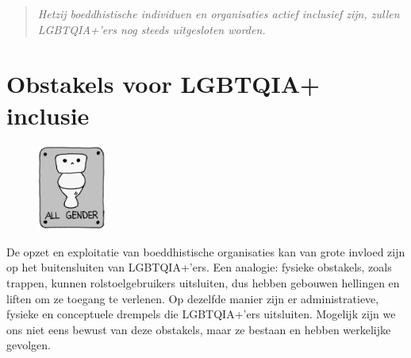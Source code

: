 \documentclass[12pt,openany]{book}
\begin{document}
\newpage
\thispagestyle{empty}
\begin{figure}[h]
    \centering
\end{figure}

\begin{quote}
\centering
\textit{\Large Hetzij boeddhistische individuen en organisaties actief inclusief zijn, zullen LGBTQIA+’ers nog steeds uitgesloten worden.}
\end{quote}

\chapter*{Obstakels voor LGBTQIA+ inclusie}

\begin{figure}
    \centering
    \includegraphics[width=0.2\textwidth]{16bw.png}
\end{figure}
De opzet en exploitatie van boeddhistische organisaties kan van grote invloed zijn op het buitensluiten van LGBTQIA+’ers. Een analogie: fysieke obstakels, zoals trappen, kunnen rolstoelgebruikers uitsluiten, dus hebben gebouwen hellingen en liften om ze toegang te verlenen. Op dezelfde manier zijn er administratieve, fysieke en conceptuele drempels die LGBTQIA+’ers uitsluiten. Mogelijk zijn we ons niet eens bewust van deze obstakels, maar ze bestaan en hebben werkelijke gevolgen.
\end{document}
